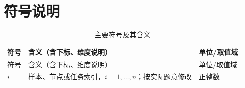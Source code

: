 \section{符号说明}

\begin{longtable}{@{}p{}p{}p{}@{}}
\caption{主要符号及其含义}\label{tab:symbols}\\
\toprule
符号 & 含义（含下标、维度说明） & 单位/取值域 \\
\midrule
\endfirsthead
\toprule
符号 & 含义（含下标、维度说明） & 单位/取值域 \\
\midrule
\endhead
\bottomrule
\endfoot
$i$ & 样本、节点或任务索引，$i=1,\ldots,n$；按实际题意修改 & 正整数 \\
\end{longtable}

